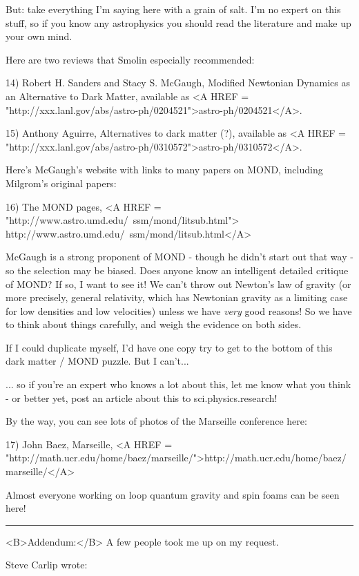 But: take everything I'm saying here with a grain of salt.  I'm no expert 
on this stuff, so if you know any astrophysics you should read the 
literature and make up your own mind.  

Here are two reviews that Smolin especially recommended:

14) Robert H. Sanders and Stacy S. McGaugh, Modified Newtonian Dynamics 
as an Alternative to Dark Matter, available as <A HREF = "http://xxx.lanl.gov/abs/astro-ph/0204521">astro-ph/0204521</A>.

15) Anthony Aguirre, Alternatives to dark matter (?), available as
<A HREF = "http://xxx.lanl.gov/abs/astro-ph/0310572">astro-ph/0310572</A>.

Here's McGaugh's website with links to many papers on MOND, including
Milgrom's original papers:

16) The MOND pages, 
<A HREF = "http://www.astro.umd.edu/~ssm/mond/litsub.html">
http://www.astro.umd.edu/~ssm/mond/litsub.html</A>

McGaugh is a strong proponent of MOND - though he didn't start out that
way - so the selection may be biased.  Does anyone know an intelligent 
detailed critique of MOND?  If so, I want to see it!  We can't throw out 
Newton's law of gravity (or more precisely, general relativity, which has 
Newtonian gravity as a limiting case for low densities and low velocities)
unless we have \emph{very} good reasons!  So we have to think about things
carefully, and weigh the evidence on both sides.

If I could duplicate myself, I'd have one copy try to get to the bottom
of this dark matter / MOND puzzle.  But I can't...

... so if you're an expert who knows a lot about this, let me 
know what you think - or better yet, post an article about this to 
sci.physics.research!

By the way, you can see lots of photos of the Marseille conference
here:

17) John Baez, Marseille, <A HREF = "http://math.ucr.edu/home/baez/marseille/">http://math.ucr.edu/home/baez/marseille/</A>

Almost everyone working on loop quantum gravity and spin foams can
be seen here!


\par\noindent\rule{\textwidth}{0.4pt}
<B>Addendum:</B>
A few people took me up on my request.  

Steve Carlip wrote:



